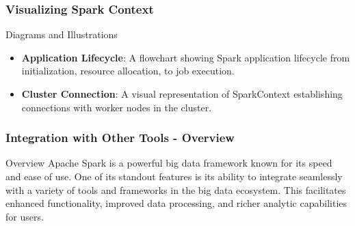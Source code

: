 \documentclass[aspectratio=169]{beamer}
\begin{document}
\begin{frame}[fragile]
    \frametitle{Visualizing Spark Context}
    
    \begin{block}{Diagrams and Illustrations}
        \begin{itemize}
            \item \textbf{Application Lifecycle}: A flowchart showing Spark application lifecycle from initialization, resource allocation, to job execution.
            \item \textbf{Cluster Connection}: A visual representation of SparkContext establishing connections with worker nodes in the cluster.
        \end{itemize}
    \end{block}
\end{frame}

\begin{frame}[fragile]
    \frametitle{Integration with Other Tools - Overview}
    \begin{block}{Overview}
        Apache Spark is a powerful big data framework known for its speed and ease of use. 
        One of its standout features is its ability to integrate seamlessly with a variety of tools and frameworks in the big data ecosystem.
        This facilitates enhanced functionality, improved data processing, and richer analytic capabilities for users.
    \end{block}
\end{frame}
\end{document}
